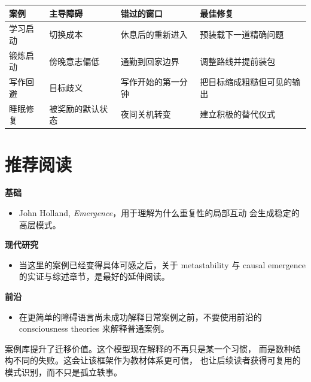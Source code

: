 \begin{center}
\begin{tabularx}{\textwidth}{@{}l l l X@{}}
\toprule
案例 & 主导障碍 & 错过的窗口 & 最佳修复 \\
\midrule
学习启动 & 切换成本 & 休息后的重新进入 & 预装载下一道精确问题 \\
锻炼启动 & 傍晚意志偏低 & 通勤到回家边界 & 调整路线并提前装包 \\
写作回避 & 目标歧义 & 写作开始的第一分钟 & 把目标缩成粗糙但可见的输出 \\
睡眠修复 & 被奖励的默认状态 & 夜间关机转变 & 建立积极的替代仪式 \\
\bottomrule
\end{tabularx}
\end{center}

\section{推荐阅读}

\begin{readingbox}
\textbf{基础}
\begin{itemize}[nosep]
  \item John Holland, \emph{Emergence}，用于理解为什么重复性的局部互动
        会生成稳定的高层模式。
\end{itemize}
\textbf{现代研究}
\begin{itemize}[nosep]
  \item 当这里的案例已经变得具体可感之后，关于 metastability 与
        causal emergence 的实证与综述章节，是最好的延伸阅读。
\end{itemize}
\textbf{前沿}
\begin{itemize}[nosep]
  \item 在更简单的障碍语言尚未成功解释日常案例之前，不要使用前沿的
        consciousness theories 来解释普通案例。
\end{itemize}
\end{readingbox}

\begin{summarybox}
案例库提升了迁移价值。这个模型现在解释的不再只是某一个习惯，
而是数种结构不同的失败。这会让该框架作为教材体系更可信，
也让后续读者获得可复用的模式识别，而不只是孤立轶事。
\end{summarybox}